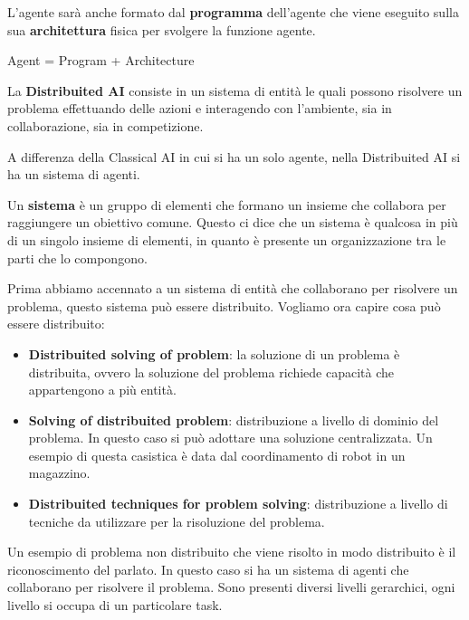 L'agente sarà anche formato dal \textbf{programma} dell'agente che viene
eseguito sulla sua \textbf{architettura} fisica per svolgere la funzione agente.
\begin{center}
    Agent = Program + Architecture
\end{center}
\begin{definizione} 
    La \textbf{Distribuited AI} consiste in un sistema di entità le quali possono
    risolvere un problema effettuando delle azioni e interagendo con l'ambiente,
    sia in collaborazione, sia in competizione.
\end{definizione}
A differenza della Classical AI in cui si ha un solo agente, nella Distribuited AI
si ha un sistema di agenti.
\begin{definizione} 
    Un \textbf{sistema} è un gruppo di elementi che formano un insieme che
    collabora per raggiungere un obiettivo comune. Questo ci dice che un sistema
    è qualcosa in più di un singolo insieme di elementi, in quanto è presente un
    organizzazione tra le parti che lo compongono.
\end{definizione}
Prima abbiamo accennato a un sistema di entità che collaborano per risolvere un
problema, questo sistema può essere distribuito. Vogliamo ora capire cosa
può essere distribuito:
\begin{itemize}
    \item \textbf{Distribuited solving of problem}: la soluzione di un problema
          è distribuita, ovvero la soluzione del problema richiede capacità che
          appartengono a più entità.
    \item \textbf{Solving of distribuited problem}: distribuzione a livello di
          dominio del problema. In questo caso si può adottare una soluzione
          centralizzata. Un esempio di questa casistica è data dal coordinamento
          di robot in un magazzino.
    \item \textbf{Distribuited techniques for problem solving}: distribuzione a
          livello di tecniche da utilizzare per la risoluzione del problema.
\end{itemize}
\begin{esempio}
    Un esempio di problema non distribuito che viene risolto in modo distribuito
    è il riconoscimento del parlato. In questo caso si ha un sistema di agenti
    che collaborano per risolvere il problema. Sono presenti diversi livelli
    gerarchici, ogni livello si occupa di un particolare task.
\end{esempio}
